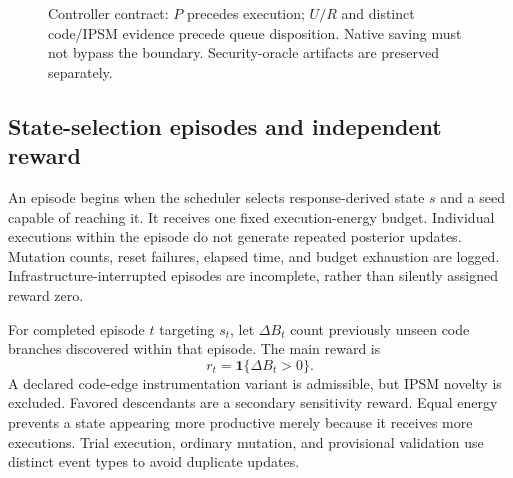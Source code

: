 \documentclass[final,5p,times,number]{elsarticle}
\newcommand{\gcode}{G_{\mathrm{code}}}
\newcommand{\gstate}{G_{\mathrm{state}}}
\begin{document}
\begin{figure}[!tp]
\centering
{}
\caption{Controller contract: $P$ precedes execution; $U/R$ and distinct code/IPSM evidence precede queue disposition. Native saving must not bypass the boundary. Security-oracle artifacts are preserved separately.}
\label{fig:architecture}
\end{figure}

\subsection{State-selection episodes and independent reward}
An episode begins when the scheduler selects response-derived state $s$ and a seed capable of reaching it. It receives one fixed execution-energy budget. Individual executions within the episode do not generate repeated posterior updates. Mutation counts, reset failures, elapsed time, and budget exhaustion are logged. Infrastructure-interrupted episodes are incomplete, rather than silently assigned reward zero.

For completed episode $t$ targeting $s_t$, let $\Delta B_t$ count previously unseen code branches discovered within that episode. The main reward is
\begin{equation}
r_t=\mathbf{1}\{\Delta B_t>0\}.
\label{eq:reward}
\end{equation}
A declared code-edge instrumentation variant is admissible, but IPSM novelty is excluded. Favored descendants are a secondary sensitivity reward. Equal energy prevents a state appearing more productive merely because it receives more executions. Trial execution, ordinary mutation, and provisional validation use distinct event types to avoid duplicate updates.
\end{document}

